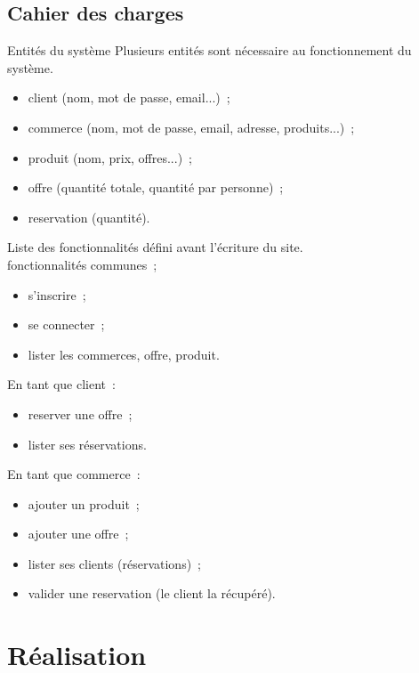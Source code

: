 \documentclass{beamer}
\begin{document}
\subsection{Cahier des charges}

\begin{frame}{Entités du système}
	Plusieurs entités sont nécessaire au fonctionnement du système.
	\begin{itemize}
		\item client (nom, mot de passe, email...)~;
		\item commerce (nom, mot de passe, email, adresse, produits...)~;
		\item produit (nom, prix, offres...)~;
		\item offre (quantité totale, quantité par personne)~;
		\item reservation (quantité).
	\end{itemize}

\end{frame}


\begin{frame}
	Liste des fonctionnalités défini avant l'écriture du site. \\
	fonctionnalités communes~;
	\begin{itemize}
		\item s'inscrire~;
		\item se connecter~;
		\item lister les commerces, offre, produit.
	\end{itemize}

	En tant que client~:
	\begin{itemize}
		\item reserver une offre~;
		\item lister ses réservations.
	\end{itemize}
	
	En tant que commerce~:
	\begin{itemize}
		\item ajouter un produit~;
		\item ajouter une offre~;
		\item lister ses clients (réservations)~;
		\item valider une reservation (le client la récupéré).
	\end{itemize}
\end{frame}

\section{Réalisation}
\end{document}
